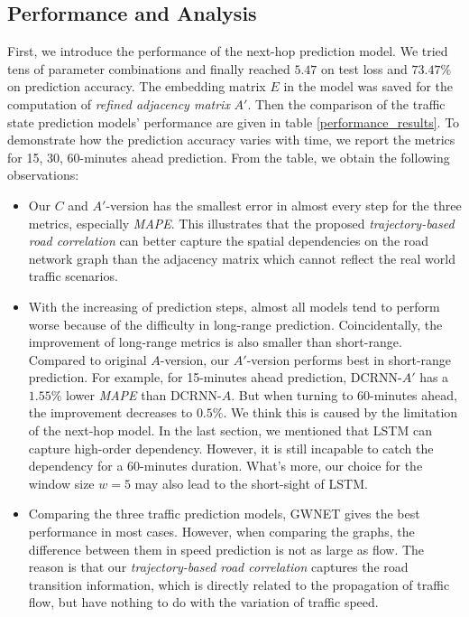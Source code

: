 \subsection{Performance and Analysis}
First, we introduce the performance of the next-hop prediction model. We tried tens of parameter combinations and finally reached $5.47$ on test loss and $73.47\%$ on prediction accuracy. The embedding matrix $E$ in the model was saved for the computation of \textit{refined adjacency matrix} $A'$. Then the comparison of the traffic state prediction models' performance are given in table \ref{performance_results}. To demonstrate how the prediction accuracy varies with time, we report the metrics for 15, 30, 60-minutes ahead prediction. From the table, we obtain the following observations:

\begin{itemize}
    \item Our $C$ and $A'$-version has the smallest error in almost every step for the three metrics, especially \textit{MAPE}. This illustrates that the proposed \textit{trajectory-based road correlation} can better capture the spatial dependencies on the road network graph than the adjacency matrix which cannot reflect the real world traffic scenarios.
    \item With the increasing of prediction steps, almost all models tend to perform worse because of the difficulty in long-range prediction. Coincidentally, the improvement of long-range metrics is also smaller than short-range. Compared to original $A$-version, our $A'$-version performs best in short-range prediction. For example, for 15-minutes ahead prediction, DCRNN-$A'$ has a $1.55\%$ lower \textit{MAPE} than DCRNN-$A$. But when turning to 60-minutes ahead, the improvement decreases to $0.5\%$. We think this is caused by the limitation of the next-hop model. In the last section, we mentioned that LSTM can capture high-order dependency. However, it is still incapable to catch the dependency for a 60-minutes duration. What's more, our choice for the window size $w=5$ may also lead to the short-sight of LSTM.
    \item Comparing the three traffic prediction models, GWNET gives the best performance in most cases. However, when comparing the graphs, the difference between them in speed prediction is not as large as flow. The reason is that our \textit{trajectory-based road correlation} captures the road transition information, which is directly related to the propagation of traffic flow, but have nothing to do with the variation of traffic speed.

\end{itemize}
